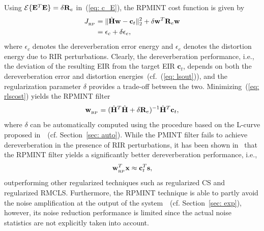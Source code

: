 \documentclass[10pt]{IEEEtran}
\begin{document}
Using ${\cal{E}}\{ \mathbf{E}^T \mathbf{E} \} = \delta \mathbf{R}_{e}$ in~(\ref{eq: c_E}), the RPMINT cost function is given by~\cite{Kodrasi_ITASLP_2013}
\begin{align}
  \label{eq: rlscost}
  J_{_{\rm RP}} &=  \| \hat{\mathbf{H}}\mathbf{w} - \mathbf{c}_t \|_2^2 + \delta  \mathbf{w}^T \mathbf{R}_{e} \mathbf{w} \\
 &= \epsilon_{{c}} + \delta \epsilon_e,
\end{align}
where $\epsilon_{{c}}$ denotes the dereverberation error energy and $\epsilon_{e}$ denotes the distortion energy due to RIR perturbations.
Clearly, the dereverberation performance, i.e., the deviation of the resulting EIR from the target EIR $\mathbf{c}_t$, depends on both the dereverberation error and distortion energies~(cf.~(\ref{eq: lsout})), and the regularization parameter $\delta$ provides a trade-off between the two.
Minimizing~(\ref{eq: rlscost}) yields the RPMINT filter
\begin{equation}
\label{eq: wrp}
\mathbf{w}_{_{\rm RP}} = (\hat{\mathbf{H}}^T\hat{\mathbf{H}} + \delta \mathbf{R}_{e})^{-1}\hat{\mathbf{H}}^T\mathbf{c}_t,
\end{equation}
where $\delta$ can be automatically computed using the procedure based on the L-curve proposed in~\cite{Kodrasi_ITASLP_2013}~(cf. Section~\ref{sec: auto}).
{{While the PMINT filter fails to achieve dereverberation in the presence of RIR perturbations, it has been shown in~\cite{Kodrasi_ITASLP_2013} that the RPMINT filter yields a significantly better dereverberation performance, i.e., 
\begin{equation}
\label{eq: rpperfect}
\mathbf{w}_{_{\rm RP}}^T\mathbf{x} \approx  \mathbf{c}_t^T \mathbf{s},
\end{equation}
outperforming other regularized techniques such as regularized CS and regularized RMCLS.}}
Furthermore, the RPMINT technique is able to partly avoid the noise amplification at the output of the system~\cite{Kodrasi_ITASLP_2013}~(cf. Section~\ref{sec: exp}), however, its noise reduction performance is limited since the actual noise statistics are not explicitly taken into account. 
\end{document}
